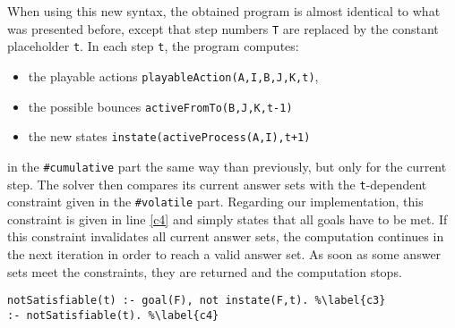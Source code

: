 When using this new syntax, the obtained program is almost identical
to what was presented before,
except that step numbers \texttt{T}
are replaced by the constant placeholder \texttt{t}.
In each step \texttt{t}, the program computes:
\begin{itemize}
  \item the playable actions \texttt{playableAction(A,I,B,J,K,t)},
  \item the possible bounces \texttt{activeFromTo(B,J,K,t-1)}
  \item the new states \texttt{instate(activeProcess(A,I),t+1)}
\end{itemize}
in the \texttt{\#cumulative} part
the same way than previously, but only for the current step.
The solver then compares its current answer sets with
the \texttt{t}-dependent constraint given in the \texttt{\#volatile} part.
Regarding our implementation, this constraint is given in line \ref{c4}
and simply states that all goals have to be met.
If this constraint invalidates all current answer sets,
the computation continues in the next iteration in order to reach a valid answer set.
As soon as some answer sets meet the constraints,
they are returned and the computation stops.
\begin{lstlisting}
notSatisfiable(t) :- goal(F), not instate(F,t). %\label{c3}
:- notSatisfiable(t). %\label{c4}
\end{lstlisting}
